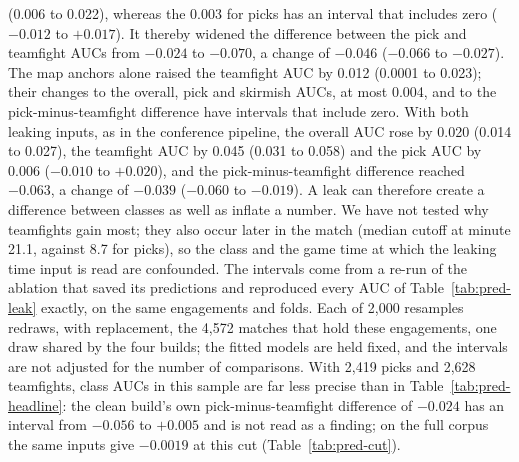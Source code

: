(0.006 to 0.022), whereas the 0.003 for picks has an interval that includes zero ($-0.012$ to $+0.017$). It
thereby widened the difference between the pick and teamfight AUCs from $-0.024$ to $-0.070$, a change of
$-0.046$ ($-0.066$ to $-0.027$). The map anchors alone raised the teamfight AUC by 0.012 (0.0001 to 0.023);
their changes to the overall, pick and skirmish AUCs, at most 0.004, and to the pick-minus-teamfight
difference have intervals that include zero. With both leaking inputs, as in the conference pipeline, the
overall AUC rose by 0.020 (0.014 to 0.027), the teamfight AUC by 0.045 (0.031 to 0.058) and the pick AUC by
0.006 ($-0.010$ to $+0.020$), and the pick-minus-teamfight difference reached $-0.063$, a change of $-0.039$
($-0.060$ to $-0.019$). A leak can therefore create a
difference between classes as well as inflate a number. We have not tested why teamfights gain most;
they also occur later in the match (median cutoff at minute 21.1, against 8.7 for picks), so the class
and the game time at which the leaking time input is read are confounded.
The intervals come from a re-run of the ablation that saved its predictions and reproduced every AUC of
Table~\ref{tab:pred-leak} exactly, on the same engagements and folds. Each of 2,000 resamples redraws, with
replacement, the 4,572 matches that hold these engagements, one draw shared by the four builds; the fitted models are held
fixed, and the intervals are not adjusted for the number of comparisons. With 2,419 picks and 2,628
teamfights, class AUCs in this sample are far less precise than in Table~\ref{tab:pred-headline}: the clean
build's own pick-minus-teamfight difference of $-0.024$ has an interval from $-0.056$ to $+0.005$ and is not
read as a finding; on the full corpus the same inputs give $-0.0019$ at this cut (Table~\ref{tab:pred-cut}).

